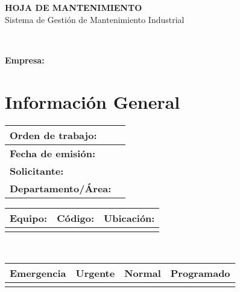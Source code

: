 \documentclass[10pt,a4paper]{article}
\begin{document}
\begin{center}
\colorbox{softblue}{\begin{minipage}{0.95\textwidth}
\begin{center}
\vspace{8pt}
{\huge\color{darkblue}\textbf{HOJA DE MANTENIMIENTO}}\\[6pt]
{\large\color{darkblue} Sistema de Gestión de Mantenimiento Industrial}\\[4pt]
\vspace{8pt}
\end{center}
\end{minipage}}\\[8pt]

\begin{minipage}{0.95\textwidth}
\centering
{\large\textbf{Empresa:} \hrulefill}
\end{minipage}
\end{center}

\section*{\color{darkblue}Información General}
\begin{tabular}{|>{}P{0.25\textwidth}|P{0.65\textwidth}|}
\hline
    \textbf{Orden de trabajo:} & \\[8pt]
\hline
    \textbf{Fecha de emisión:} & \\[8pt]
\hline
    \textbf{Solicitante:} & \\[8pt]
\hline
    \textbf{Departamento/Área:} & \\[8pt]
\hline
\end{tabular}

\vspace{0.3cm}

\begin{tabular}{|>{}P{0.30\textwidth}|>{}P{0.30\textwidth}|>{}P{0.30\textwidth}|}
\hline
    \textbf{Equipo:} & \textbf{Código:} & \textbf{Ubicación:} \\[8pt]
\hline
 & & \\[12pt]
\hline
\end{tabular}

\vspace{0.08cm}

\\[4pt]
\begin{tabular}{|>{}C{0.22\textwidth}|>{}C{0.22\textwidth}|>{}C{0.22\textwidth}|>{}C{0.22\textwidth}|}
\hline
    \textbf{Emergencia} & \textbf{Urgente} & \textbf{Normal} & \textbf{Programado} \\[8pt]
\hline
\fbox{\phantom{X}} & \fbox{\phantom{X}} & \fbox{\phantom{X}} & \fbox{\phantom{X}} \\[8pt]
\hline
\end{tabular}
\end{document}
